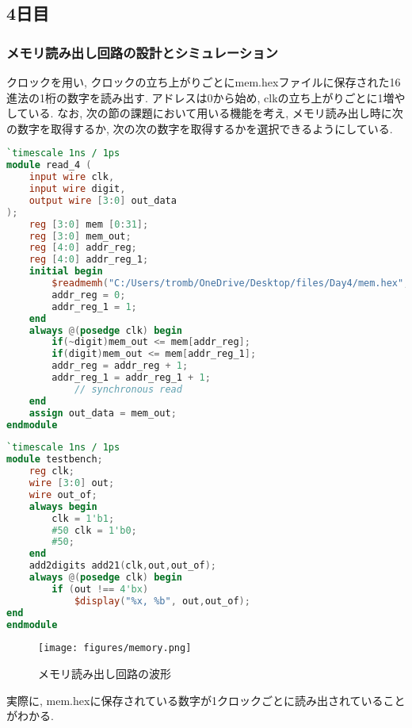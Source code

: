 \documentclass[titlepage]{ltjsarticle}
\begin{document}
\subsection{4日目}
\subsubsection{メモリ読み出し回路の設計とシミュレーション}
クロックを用い, クロックの立ち上がりごとにmem.hexファイルに保存された16進法の1桁の数字を読み出す. アドレスは0から始め, clkの立ち上がりごとに1増やしている. なお, 次の節の課題において用いる機能を考え, メモリ読み出し時に次の数字を取得するか, 次の次の数字を取得するかを選択できるようにしている. 
\begin{lstlisting}[caption=メモリ読み出し回路デザイン,language=verilog]
`timescale 1ns / 1ps 
module read_4 ( 
    input wire clk,
    input wire digit,
    output wire [3:0] out_data
);
    reg [3:0] mem [0:31];
    reg [3:0] mem_out;
    reg [4:0] addr_reg;
    reg [4:0] addr_reg_1;
    initial begin
        $readmemh("C:/Users/tromb/OneDrive/Desktop/files/Day4/mem.hex", mem);
        addr_reg = 0;
        addr_reg_1 = 1;
    end
    always @(posedge clk) begin
        if(~digit)mem_out <= mem[addr_reg];
        if(digit)mem_out <= mem[addr_reg_1];
        addr_reg = addr_reg + 1;
        addr_reg_1 = addr_reg_1 + 1;
            // synchronous read
    end
    assign out_data = mem_out;
endmodule
\end{lstlisting}
\begin{lstlisting}[caption=メモリ読み出し回路テストベンチ,language=verilog]
`timescale 1ns / 1ps
module testbench;
    reg clk;
    wire [3:0] out;
    wire out_of;
    always begin
        clk = 1'b1;
        #50 clk = 1'b0;
        #50;
    end
    add2digits add21(clk,out,out_of);
    always @(posedge clk) begin
        if (out !== 4'bx)
            $display("%x, %b", out,out_of);
end
endmodule
\end{lstlisting}
\begin{figure}[H]
    \begin{center}
        \texttt{[image: figures/memory.png]}
        \caption{メモリ読み出し回路の波形}
    \end{center}
\end{figure}
実際に, mem.hexに保存されている数字が1クロックごとに読み出されていることがわかる. 
\end{document}
